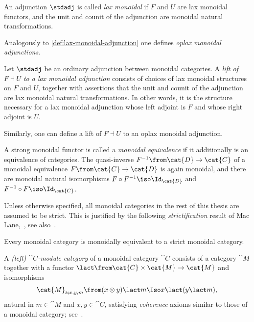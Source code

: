\begin{definition}\label{def:lax-monoidal-adjunction}
  An adjunction \(\stdadj\) is called \emph{lax monoidal} if \(F\) and \(U\) are lax monoidal functors,
  and the unit and counit of the adjunction are monoidal natural transformations.
\end{definition}

Analogously to \cref{def:lax-monoidal-adjunction} one defines \emph{oplax monoidal adjunctions}.

\begin{definition}\label{def:lift-to-monoidal-adjunction}
  Let \(\stdadj\) be an ordinary adjunction between monoidal categories.
  A \emph{lift of \(F \dashv U\) to a lax monoidal adjunction} consists of choices of lax monoidal structures on \(F\) and \(U\),
  together with assertions that the unit and counit of the adjunction are lax monoidal natural transformations.
  In other words, it is the structure necessary for a lax monoidal adjunction
  whose left adjoint is \(F\) and whose right adjoint is \(U\).

  Similarly, one can define a lift of \(F \dashv U\) to an oplax monoidal adjunction.
\end{definition}

\begin{remark}
  A strong monoidal functor is called a \emph{monoidal equivalence} if it additionally is an equivalence of categories.
  The quasi-inverse \(F^{-1}\from \cat{D}\to \cat{C}\) of a monoidal equivalence \(F\from \cat{C} \to \cat{D}\)
  is again monoidal, and there are monoidal natural isomorphisms \(F \circ F^{-1} \iso \Id_{\cat{D}}\) and \(F^{-1} \circ F \iso \Id_{\cat{C}}\).
\end{remark}

Unless otherwise specified,
all monoidal categories in the rest of this thesis are assumed to be strict.
This is justified by the following \emph{strictification} result of Mac Lane,~\cite{MacLane63naturalassociativity},
see also~\cite[Theorem~2.8.5]{Etingof2015}.

\begin{theorem}\label{thm:monoidal-strictness-theorem}
  Every monoidal category is monoidally equivalent to a strict monoidal category.
\end{theorem}

\begin{definition}\label{def:right-module-category}
  A \emph{(left) \(\cat{C}\)\hyp{}module category}
  of a monoidal category \(\cat{C}\) consists of a category \(\cat{M}\)
  together with a functor \(\lact \from \cat{C} \times \cat{M} \to \cat{M}\)
  and isomorphisms
  \[
    \cat{M}_{\mathsf{a}; x, y, m} \from (x \otimes y) \lact m \Iso x \lact (y \lact m),
  \]
  natural in \(m \in \cat{M}\) and \(x,y \in \cat{C}\),
  satisfying \emph{coherence} axioms similar to those of a monoidal category;
  see~\cite[Definition~7.1.1]{Etingof2015}.
\end{definition}

